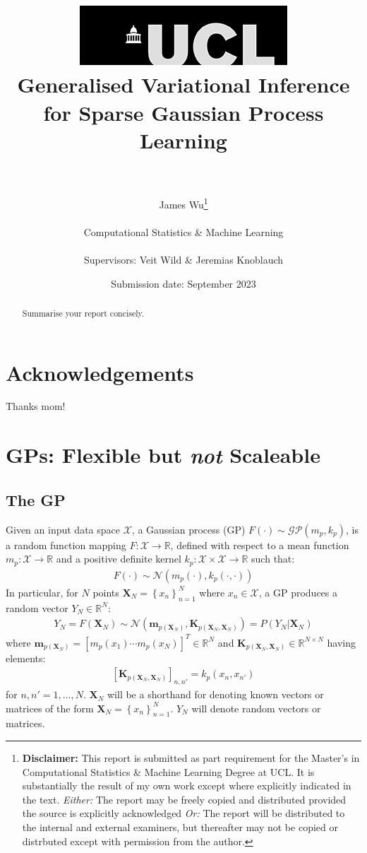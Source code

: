 \documentclass{article}
\title{  	{ \includegraphics[scale=.5]{ucl_logo.png}}\\
{{\Huge Generalised Variational Inference for Sparse Gaussian Process Learning}}\\
{\large }\\
		}
\date{Submission date: September 2023}
\author{James Wu\thanks{
{\bf Disclaimer:}
This report is submitted as part requirement for the Master's in Computational Statistics \& Machine Learning Degree at UCL. It is
substantially the result of my own work except where explicitly indicated in the text.
\newline  %
\emph{Either: }The report may be freely copied and distributed provided the source is explicitly acknowledged
\newline  %
\emph{Or: }The report will be distributed to the internal and external examiners, but thereafter may not be copied or distrbuted except with permission from the author.}
\\ \\
Computational Statistics \& Machine Learning\\ \\
Supervisors: Veit Wild \& Jeremias Knoblauch}
\numberwithin{equation}{section}
\begin{document}
\onehalfspacing
\maketitle
{}
\newpage
\setcounter{page}{1}
\section*{Acknowledgements}
Thanks mom!
\newpage

\begin{abstract}
Summarise your report concisely.
\end{abstract}
\newpage
\tableofcontents
\newpage
{}
\setcounter{page}{1}
\section{GPs: Flexible but \textit{not} Scaleable}
\subsection{The GP}
Given an input data space $\mathcal{X}$, a Gaussian process (GP) $F(\cdot) \sim \mathcal{GP}(m_p, k_p)$, is a random function mapping $F: \mathcal{X} \rightarrow \mathbb{R}$, defined with respect to a mean function $m_p: \mathcal{X} \rightarrow \mathbb{R}$ and a positive definite kernel $k_p: \mathcal{X} \times \mathcal{X} \rightarrow \mathbb{R}$ such that:
\begin{align}
    F(\cdot) \sim \mathcal{N}(m_p(\cdot), k_p(\cdot, \cdot))
    \label{gp}
\end{align}
In particular, for $N$ points $\mathbf{X}_N = \left\{ x_n\right\}_{n=1}^N$ where $x_n \in \mathcal{X}$, a GP produces a random vector $Y_N \in \mathbb{R}^{N}$:
\begin{align}
    \label{gp-vector}
    Y_N = F\left(\mathbf{X}_N\right) \sim  \mathcal{N}\left(\mathbf{m}_{p\left(\mathbf{X}_N\right)}, \mathbf{K}_{p\left(\mathbf{X}_N, \mathbf{X}_N\right)}\right) = P\left(Y_N \vert \mathbf{X}_N\right)
\end{align}
where $\mathbf{m}_{p(\mathbf{X}_N)} = \left[ m_p(x_1) \cdots m_p(x_N)\right]^T \in \mathbb{R}^N$ and $\mathbf{K}_{p(\mathbf{X}_N, \mathbf{X}_N)} \in \mathbb{R}^{N \times N}$ having elements:
\begin{align}
    \left[\mathbf{K}_{p(\mathbf{X}_N, \mathbf{X}_N)}\right]_{n, n'} = k_p(x_n, x_{n'})
\end{align}
for $n, n'=1,\dots, N$. $\mathbf{X}_N$ will be a shorthand for denoting known vectors or matrices of the form $\mathbf{X}_N = \left\{ x_n\right\}_{n=1}^N$. $Y_N$ will denote random vectors or matrices.
\end{document}
